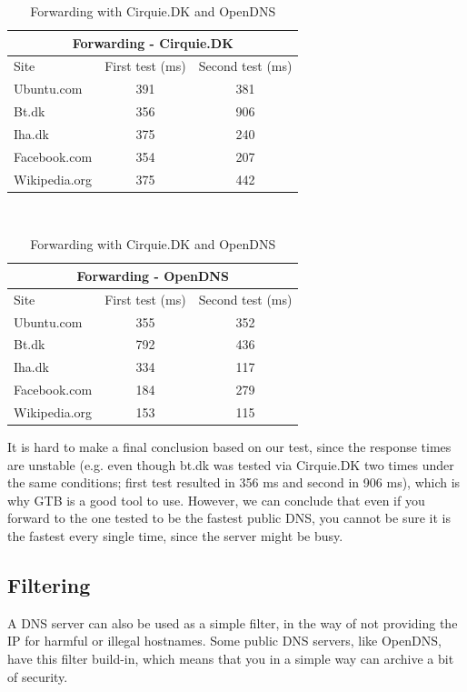 \documentclass[a4paper,10pt]{report}
\begin{document}
\begin{table}[H]

\begin{center}
  \begin{tabular}{l|c|c}
    \multicolumn{3}{c}{Forwarding - Cirquie.DK}  \\
	\hline Site & First test (ms) & Second test (ms) \\ \hline
    Ubuntu.com & 391 & 381  \\ %
    Bt.dk & 356 & 906  \\ %
	Iha.dk & 375 & 240 \\ %
	Facebook.com & 354 &	207 \\ %
	Wikipedia.org & 375 & 442 \\ \hline
  \end{tabular}
\end{center}
~\\
\begin{center}
  \begin{tabular}{l|c|c}
    \multicolumn{3}{c}{Forwarding - OpenDNS}  \\
	\hline Site & First test (ms) & Second test (ms) \\     
    \hline
    Ubuntu.com & 355 & 352  \\ %
    Bt.dk & 792 & 436  \\ %
	Iha.dk & 334 & 117 \\ %
	Facebook.com & 184 & 279 \\ %
	Wikipedia.org & 153 & 115 \\ \hline
  \end{tabular}
\end{center}
\caption{Forwarding with Cirquie.DK and OpenDNS}
\label{tab:Forwarding}
\end{table}


It is hard to make a final conclusion based on our test, since the response times are unstable (e.g. even though bt.dk was tested via Cirquie.DK two times under the same conditions; first test resulted in 356 ms and second in 906 ms), which is why GTB is a good tool to use. 
However, we can conclude that even if you forward to the one tested to be the fastest public DNS, you cannot be sure it is the fastest every single time, since the server might be busy.

\subsection{Filtering}
A DNS server can also be used as a simple filter, in the way of not providing the IP for harmful or illegal hostnames. 
Some public DNS servers, like OpenDNS, have this filter build-in, which means that you in a simple way can archive a bit of security.
\end{document}
